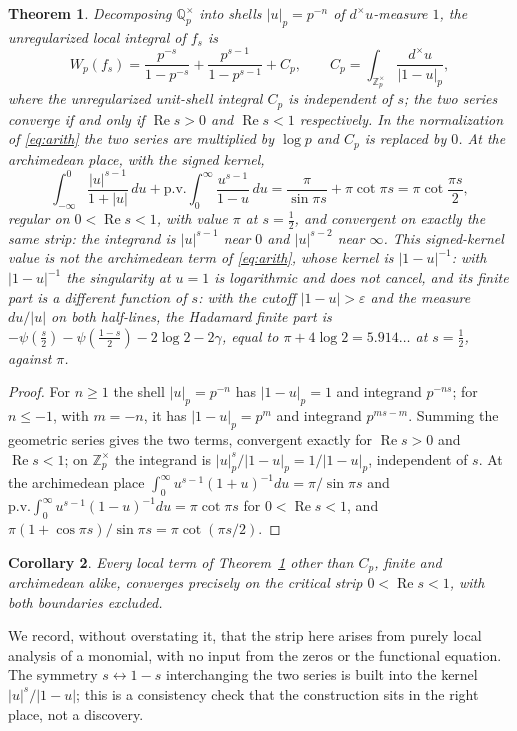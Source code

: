 \documentclass[11pt]{amsart}
\newtheorem{theorem}{Theorem}[section]
\newtheorem{corollary}[theorem]{Corollary}
\theoremstyle{definition}
\theoremstyle{remark}
\newcommand{\Z}{\mathbb Z}
\newcommand{\Q}{\mathbb Q}
\newcommand{\Rel}{\operatorname{Re}}
\begin{document}
\begin{theorem}\label{thm:localterms}
Decomposing $\Q_p^\times$ into shells $|u|_p=p^{-n}$ of $d^\times u$-measure
$1$, the unregularized local integral of $f_s$ is
\[
 W_p(f_s)=\frac{p^{-s}}{1-p^{-s}}+\frac{p^{s-1}}{1-p^{s-1}}+C_p,
 \qquad
 C_p=\int_{\Z_p^\times}\frac{d^\times u}{|1-u|_p},
\]
where the \emph{unregularized unit-shell integral} $C_p$ is independent of
$s$; the two series converge if and only if $\Rel s>0$ and $\Rel s<1$
respectively.  In the normalization of \eqref{eq:arith} the two series are
multiplied by $\log p$ and $C_p$ is replaced by $0$.  At the archimedean
place, with the \emph{signed} kernel,
\[
 \int_{-\infty}^0\frac{|u|^{s-1}}{1+|u|}\,du
 +\mathrm{p.v.}\!\int_0^\infty\frac{u^{s-1}}{1-u}\,du
 =\frac{\pi}{\sin\pi s}+\pi\cot\pi s=\pi\cot\frac{\pi s}{2},
\]
regular on $0<\Rel s<1$, with value $\pi$ at $s=\tfrac12$, and convergent
on exactly the same strip: the integrand is $|u|^{s-1}$ near $0$ and
$|u|^{s-2}$ near $\infty$.  This signed-kernel value is not the
archimedean term of \eqref{eq:arith}, whose kernel is $|1-u|^{-1}$: with
$|1-u|^{-1}$ the singularity at $u=1$ is logarithmic and does not cancel,
and its finite part is a different function of $s$: with the cutoff
$|1-u|>\varepsilon$ and the measure $du/|u|$ on both half-lines, the
Hadamard finite part is
$-\psi(\tfrac s2)-\psi(\tfrac{1-s}2)-2\log2-2\gamma$, equal to
$\pi+4\log2=5.914\ldots$ at $s=\tfrac12$, against $\pi$.
\end{theorem}

\begin{proof}
For $n\ge1$ the shell $|u|_p=p^{-n}$ has $|1-u|_p=1$ and integrand
$p^{-ns}$; for $n\le-1$, with $m=-n$, it has $|1-u|_p=p^{m}$ and integrand
$p^{ms-m}$.  Summing the geometric series gives the two terms, convergent
exactly for $\Rel s>0$ and $\Rel s<1$; on $\Z_p^\times$ the integrand is
$|u|_p^{s}/|1-u|_p=1/|1-u|_p$, independent of $s$.  At the archimedean
place $\int_0^\infty u^{s-1}(1+u)^{-1}du=\pi/\sin\pi s$ and
$\mathrm{p.v.}\int_0^\infty u^{s-1}(1-u)^{-1}du=\pi\cot\pi s$ for
$0<\Rel s<1$, and $\pi(1+\cos\pi s)/\sin\pi s=\pi\cot(\pi s/2)$.
\end{proof}

\begin{corollary}
Every local term of Theorem~\ref{thm:localterms} other than $C_p$, finite
and archimedean alike, converges precisely on the
critical strip $0<\Rel s<1$, with both boundaries excluded.
\end{corollary}

We record, without overstating it, that the strip here arises from purely
local analysis of a monomial, with no input from the zeros or the functional
equation.  The symmetry $s\leftrightarrow 1-s$ interchanging the two series
is built into the kernel $|u|^{s}/|1-u|$; this is a consistency check that
the construction sits in the right place, not a discovery.
\end{document}
